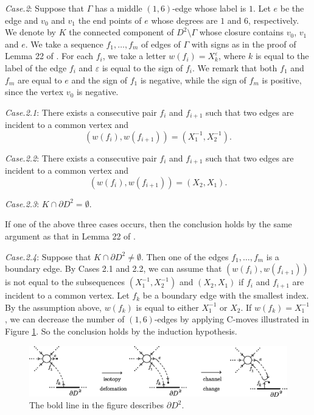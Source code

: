 \documentclass{amsart}
\theoremstyle{plain}
\theoremstyle{definition}
\begin{document}
\par

{\it Case.2}: Suppose that $\Gamma$ has a middle $(1,6)$-edge whose label is $1$. 
Let $e$ be the edge and $v_0$ and $v_1$ the end points of $e$ whose degrees are $1$ and $6$, respectively. 
We denote by $K$ the connected component of $D^2\setminus\Gamma$ whose closure contains $v_0$, $v_1$ and $e$. 
We take a sequence $f_1,\ldots,f_m$ of edges of $\Gamma$ with signs as in the proof of Lemma 22 of \cite{KMMW}. 
For each $f_i$, we take a letter $w(f_i)=X_k^{\varepsilon}$, where $k$ is equal to the label of the edge $f_i$ 
and $\varepsilon$ is equal to the sign of $f_i$. 
We remark that both $f_1$ and $f_m$ are equal to $e$ and the sign of $f_1$ is negative, while the sign of $f_m$ is positive, since the vertex $v_0$ is negative. 

\par

{\it Case.2.1}: There exists a consecutive pair $f_i$ and $f_{i+1}$ such that two edges are incident to a common vertex and
\[
(w(f_i),w(f_{i+1}))=(X_1^{-1},X_2^{-1}). 
\]

{\it Case.2.2}: There exists a consecutive pair $f_i$ and $f_{i+1}$ such that two edges are incident to a common vertex and
\[
(w(f_i),w(f_{i+1}))=(X_2,X_1). 
\]

{\it Case.2.3}: $K\cap\partial D^2=\emptyset$. 

If one of the above three cases occurs, then the conclusion holds by the same argument as that in Lemma 22 of \cite{KMMW}. 

{\it Case.2.4}: Suppose that $K\cap\partial D^2\neq\emptyset$. 
Then one of the edges $f_1,\ldots,f_m$ is a boundary edge. 
By Cases 2.1 and 2.2, we can assume that $(w(f_i),w(f_{i+1}))$ is not equal to the subsequences $(X_1^{-1},X_2^{-1})$ and $(X_2,X_1)$ if $f_i$ and $f_{i+1}$ are incident to a common vertex. 
Let $f_k$ be a boundary edge with the smallest index. 
By the assumption above, $w(f_k)$ is equal to either $X_1^{-1}$ or $X_2$. 
If $w(f_k)=X_1^{-1}$, we can decrease the number of $(1,6)$-edges by applying C-moves illustrated in Figure \ref{move_case24.1}. 
So the conclusion holds by the induction hypothesis. 

\begin{figure}[htbp]
\begin{center}
\includegraphics[width=145mm]{move_case241.eps}
\end{center}
\caption{The bold line in the figure describes $\partial D^2$. }
\label{move_case24.1}
\end{figure}
\end{document}
